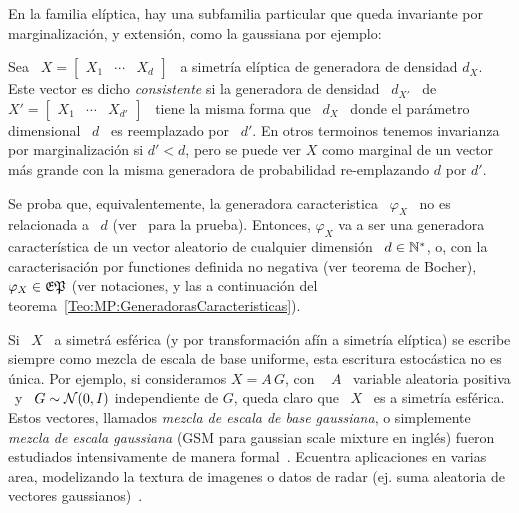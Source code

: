 En la familia  el\'iptica, hay una subfamilia particular  que queda invariante por
marginalizaci\'on, y extensi\'on, como la gaussiana por ejemplo:
%
\begin{definicion}
%
  Sea \  $X = \begin{bmatrix} X_1 &  \cdots & X_d \end{bmatrix}$  \ a simetr\'ia
  el\'iptica  de  generadora  de  densidad  $d_X$.   Este  vector  es  dicho  {\em
    consistente}   si  la   generadora  de   densidad  \   $d_{X'}$  \   de  $X'
  = \begin{bmatrix} X_1 & \cdots &  X_{d'} \end{bmatrix}$ \ tiene la misma forma
  que \ $d_X$  \ donde el par\'ametro  dimensional \ $d$ \ es  reemplazado por \
  $d'$.  En  otros termoinos tenemos  invarianza por marginalizaci\'on si  $d' <
  d$, pero se puede ver $X$ como marginal de un vector m\'as grande con la misma
  generadora de probabilidad re-emplazando $d$ por $d'$.

  Se proba  que, equivalentemente, la generadora caracteristica  \ $\varphi_X$ \
  no  es  relacionada a  \  $d$  (ver~\cite{Kan94,  FanKot90} para  la  prueba).
  Entonces, $\varphi_X$  va a ser  una generadora caracter\'istica de  un vector
  aleatorio   de  cualquier   dimensi\'on  \   $d  \in   \mathbb{N}^*$,  o,   con  la
  caracterisaci\'on por functiones definida no negativa (ver teorema de Bocher),
  \  $\varphi_X  \in  \mathfrak{EP}$  (ver   notaciones,  y  las  a  continuaci\'on  del
  teorema~\ref{Teo:MP:GeneradorasCaracteristicas}).
\end{definicion}


Si \  $X$ \ a simetr\'a  esf\'erica (y por transformaci\'on  af\'in a simetr\'ia
el\'iptica)  se escribe  siempre  como mezcla  de  escala de  base uniforme,  esta
escritura estoc\'astica  no es \'unica. Por  ejemplo, si consideramos $X  = A \,
G$, con \
$A$ \ variable  aleatoria positiva \ y \ $G \sim  \mathcal{N}(0,I)$ independiente de $G$,
queda claro  que \ $X$  \ es a  simetr\'ia esf\'erica. Estos  vectores, llamados
{\em mezcla  de escala de base  gaussiana}, o simplemente {\em  mezcla de escala
  gaussiana}  (GSM para gaussian  scale mixture  en ingl\'es)  fueron estudiados
intensivamente de manera formal~\cite{Kan94,  Yao73, Ver64, Pic70, Kel71, Kin72,
  KeiSte74, Tei60, AndMal74}.  Ecuentra aplicaciones en varias area, modelizando
la  textura de  imagenes  o datos  de  radar (ej.   suma  aleatoria de  vectores
gaussianos)~\cite{PorStr03,  BomBea08,   Sel08,  ShiSel07,  ZozVig10,  TisNic04,
  TodTab07}.

